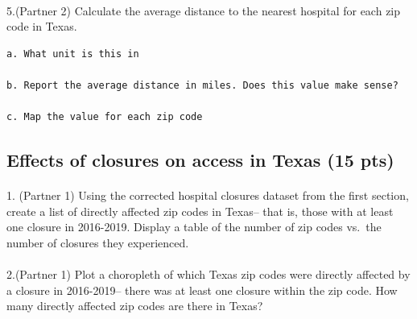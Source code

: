 \documentclass[
  letterpaper,
  DIV=11,
  numbers=noendperiod]{scrartcl}
\makeatletter
\let\oldparagraph\paragraph
\renewcommand{\paragraph}{
    \@ifstar
      \xxxParagraphStar
      \xxxParagraphNoStar
  }
\newcommand{\xxxParagraphStar}[1]{\oldparagraph*{#1}\mbox{}}
\newcommand{\xxxParagraphNoStar}[1]{\oldparagraph{#1}\mbox{}}
\makeatother
\begin{document}
\paragraph{5.(Partner 2) Calculate the average distance to the nearest
hospital for each zip code in
Texas.}\label{partner-2-calculate-the-average-distance-to-the-nearest-hospital-for-each-zip-code-in-texas.}

\begin{verbatim}
a. What unit is this in

b. Report the average distance in miles. Does this value make sense?

c. Map the value for each zip code
\end{verbatim}

\subsection{Effects of closures on access in Texas (15
pts)}\label{effects-of-closures-on-access-in-texas-15-pts}

\paragraph{1. (Partner 1) Using the corrected hospital closures dataset
from the first section, create a list of directly affected zip codes in
Texas-- that is, those with at least one closure in 2016-2019. Display a
table of the number of zip codes vs.~the number of closures they
experienced.}\label{partner-1-using-the-corrected-hospital-closures-dataset-from-the-first-section-create-a-list-of-directly-affected-zip-codes-in-texas-that-is-those-with-at-least-one-closure-in-2016-2019.-display-a-table-of-the-number-of-zip-codes-vs.-the-number-of-closures-they-experienced.}

\paragraph{2.(Partner 1) Plot a choropleth of which Texas zip codes were
directly affected by a closure in 2016-2019-- there was at least one
closure within the zip code. How many directly affected zip codes are
there in
Texas?}\label{partner-1-plot-a-choropleth-of-which-texas-zip-codes-were-directly-affected-by-a-closure-in-2016-2019-there-was-at-least-one-closure-within-the-zip-code.-how-many-directly-affected-zip-codes-are-there-in-texas}
\end{document}
